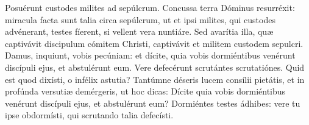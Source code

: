 
Posuérunt custodes milites ad sepúlcrum. Concussa terra Dóminus resurréxit: miracula facta sunt talia circa sepúlcrum, ut et ipsi milites, qui custodes advénerant, testes fíerent, si vellent vera nuntiáre. Sed avarítia illa, quæ captivávit discipulum cómitem Christi, captivávit et militem custodem sepulcri. Damus, inquiunt, vobis pecúniam: et dícite, quia vobis dormiéntibus venérunt discípuli ejus, et abstulérunt eum. Vere defecérunt scrutántes scrutatiónes. Quid est quod dixísti, o infélix astutia? Tantúmne déseris lucem consílii pietátis, et in profúnda versutiæ demérgeris, ut hoc dicas: Dícite quia vobis dormiéntibus venérunt discípuli ejus, et abstulérunt eum? Dormiéntes testes ádhibes: vere tu ipse obdormísti, qui scrutando talia defecísti.
\par
